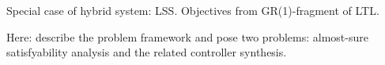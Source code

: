 Special case of hybrid system: LSS.
Objectives from GR(1)-fragment of LTL.

Here: describe the problem framework and pose two problems: almost-sure satisfyability analysis and the related controller synthesis.

